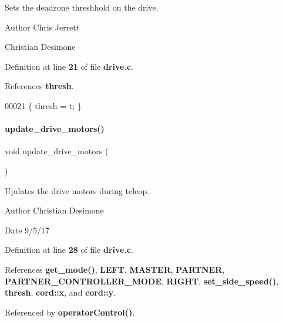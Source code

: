 Sets the deadzone threshhold on the drive. 

\begin{DoxyAuthor}{Author}
Chris Jerrett

Christian Desimone 
\end{DoxyAuthor}


Definition at line \textbf{ 21} of file \textbf{ drive.\+c}.



References \textbf{ thresh}.


\begin{DoxyCode}
00021 \{ thresh = t; \}
\end{DoxyCode}
\mbox{\label{a00014_a8224a4626a934d30ed587671b7004bf8}} 
\paragraph{update\+\_\+drive\+\_\+motors()}
{\footnotesize\ttfamily void update\+\_\+drive\+\_\+motors (\begin{DoxyParamCaption}{ }\end{DoxyParamCaption})}



Updates the drive motors during teleop. 

\begin{DoxyAuthor}{Author}
Christian Desimone 
\end{DoxyAuthor}
\begin{DoxyDate}{Date}
9/5/17 
\end{DoxyDate}


Definition at line \textbf{ 28} of file \textbf{ drive.\+c}.



References \textbf{ get\+\_\+mode()}, \textbf{ L\+E\+FT}, \textbf{ M\+A\+S\+T\+ER}, \textbf{ P\+A\+R\+T\+N\+ER}, \textbf{ P\+A\+R\+T\+N\+E\+R\+\_\+\+C\+O\+N\+T\+R\+O\+L\+L\+E\+R\+\_\+\+M\+O\+DE}, \textbf{ R\+I\+G\+HT}, \textbf{ set\+\_\+side\+\_\+speed()}, \textbf{ thresh}, \textbf{ cord\+::x}, and \textbf{ cord\+::y}.



Referenced by \textbf{ operator\+Control()}.



